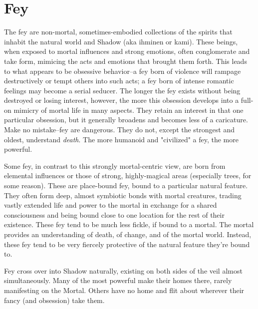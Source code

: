 \clearpage
\section{Fey}
The fey are non-mortal, sometimes-embodied collections of the spirits that inhabit the natural world and Shadow (aka ihminen or kami). These beings, when exposed to mortal influences and strong emotions, often conglomerate and take form, mimicing the acts and emotions that brought them forth. This leads to what appears to be obsessive behavior--a fey born of violence will rampage destructively or tempt others into such acts; a fey born of intense romantic feelings may become a serial seducer. The longer the fey exists without being destroyed or losing interest, however, the more this obsession develops into a full-on mimicry of mortal life in many aspects. They retain an interest in that one particular obsession, but it generally broadens and becomes less of a caricature. Make no mistake--fey are dangerous. They do not, except the strongest and oldest, understand \textit{death}. The more humanoid and "civilized" a fey, the more powerful.

Some fey, in contrast to this strongly mortal-centric view, are born from elemental influences or those of strong, highly-magical areas (especially trees, for some reason). These are place-bound fey, bound to a particular natural feature. They often form deep, almost symbiotic bonds with mortal creatures, trading vastly extended life and power to the mortal in exchange for a shared consciousness and being bound close to one location for the rest of their existence. These fey tend to be much less fickle, if bound to a mortal. The mortal provides an understanding of death, of change, and of the mortal world. Instead, these fey tend to be very fiercely protective of the natural feature they're bound to.

Fey cross over into Shadow naturally, existing on both sides of the veil almost simultaneously. Many of the most powerful make their homes there, rarely manifesting on the Mortal. Others have no home and flit about wherever their fancy (and obsession) take them. 

